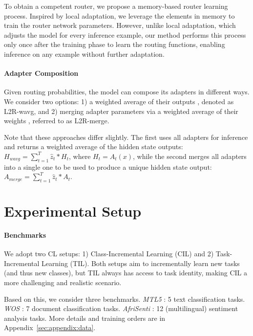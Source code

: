 \documentclass[11pt]{article}
\begin{document}
To obtain a competent router, we propose a memory-based router learning process. Inspired by local adaptation, we leverage the elements in memory to train the router network parameters. However, unlike local adaptation, which adjusts the model for every inference example, our method performs this process only once after the training phase to learn the routing functions, enabling inference on any example without further adaptation.

\paragraph{Adapter Composition}
Given routing probabilities, the model can compose its adapters in different ways. We consider two options: 1) a weighted average of their outputs \cite{shazeer2017outrageously}, denoted as L2R-wavg, and 2) merging adapter parameters via a weighted average of their weights \cite{pmlr-v162-wortsman22a}, referred to as L2R-merge.

Note that these approaches differ slightly. The first uses all adapters for inference and returns a weighted average of the hidden state outputs: $H_{wavg} = \sum_{t=1}^{T} \hat{z}_t * H_t$, where $H_t = A_t(x)$, while the second merges all adapters into a single one to be used to produce a unique hidden state output: $A_{merge} = \sum_{t=1}^{T} \hat{z}_t * A_t$.

\section{Experimental Setup}
\paragraph{Benchmarks}
We adopt two CL setups: 1) Class-Incremental Learning (CIL) and 2) Task-Incremental Learning (TIL). Both setups aim to incrementally learn new tasks (and thus new classes), but TIL always has access to task identity, making CIL a more challenging and realistic scenario.

Based on this, we consider three benchmarks. \textit{MTL5} \cite{NEURIPS2019_f8d2e80c}: 5 text classification tasks. \textit{WOS} \cite{8260658}: 7 document classification tasks. \textit{AfriSenti} \cite{muhammad-etal-2023-afrisenti}: 12 (multilingual) sentiment analysis tasks. 
More details and training orders are in Appendix~\ref{sec:appendix:data}.
\end{document}
